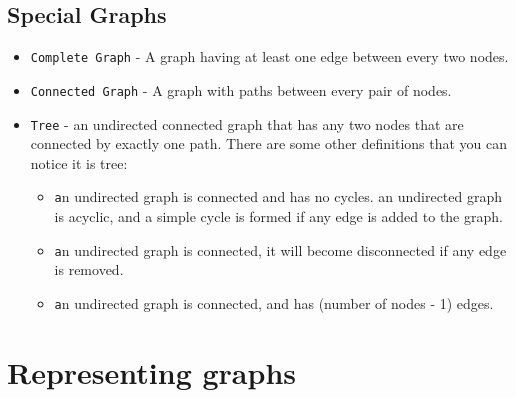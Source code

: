 \documentclass[12pt]{article}
\begin{document}
    \subsection{Special Graphs}
        \begin{itemize}
         \item \texttt{Complete Graph} -  A graph having at least one edge between every two nodes.
         \item \texttt{Connected Graph} -  A graph with paths between every pair of nodes. 
         \item \texttt{Tree} - an undirected connected graph that has any two nodes that are connected by exactly one path.
         There are some other definitions that you can notice it is tree:
             \begin{itemize}
             \item \texttt an undirected graph is connected and has no cycles.
             an undirected graph is acyclic, and a simple cycle is formed if any edge is added to the graph.
             \item \texttt an undirected graph is connected, it will become disconnected if any edge is removed.
             \item \texttt an undirected graph is connected, and has  (number of nodes - 1) edges.
             \end{itemize}
        \end{itemize}



\section{Representing graphs}
\end{document}
